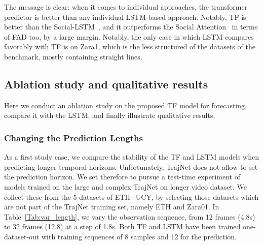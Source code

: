 \documentclass[a4paper,conference]{IEEEtran}
\begin{document}
The message is clear: when it comes to individual approaches, the transformer predictor is better than any individual LSTM-based approach. Notably, TF is better than the Social-LSTM~\cite{gupta2018social}, and it outperforms the Social Attention~\cite{kosaraju2019social} in terms of FAD too, by a large margin. Notably, the only case in which LSTM compares favorably with TF is on Zara1, which is the less structured of the datasets of the benchmark, mostly containing straight lines.











\subsection{Ablation study and qualitative results}\label{sec:abl}

Here we conduct an ablation study on the proposed TF model for forecasting, compare it with the LSTM, and finally illustrate qualitative results.


\subsubsection{Changing the Prediction Lengths \label{Sec:var_length}}

As a first study case, we compare the stability of the TF and LSTM models when predicting longer temporal horizons. Unfortunately, TrajNet does not allow to set the prediction horizon. We set therefore to pursue a test-time experiment of models trained on the large and complex TrajNet on longer video dataset. We collect these from the 5 datasets of ETH+UCY, by selecting those datasets which are not part of the TrajNet training set, namely ETH and Zara01.
In Table~\ref{Tab:var_length}, we vary the observation sequence, from 12 frames (4.8s) to 32 frames (12.8) at a step of 1.8s. Both TF and LSTM have been trained one-dataset-out with training sequences of 8 samples and 12 for the prediction. 
\end{document}
